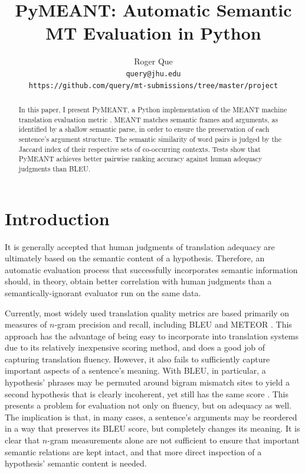 \documentclass[11pt,twocolumn]{article}
\begin{document}
\title{PyMEANT: Automatic Semantic MT Evaluation in Python}
\author{
    Roger Que\\
    {\tt query@jhu.edu}\\
    {\tt https://github.com/query/mt-submissions/tree/master/project}
}
\maketitle


\begin{abstract}
In this paper, I present PyMEANT, a Python implementation of the MEANT
machine translation evaluation metric \cite{Lo:2012}.
MEANT matches semantic frames and arguments, as identified by a shallow
semantic parse, in order to ensure the preservation of each sentence's
argument structure.
The semantic similarity of word pairs is judged by the Jaccard index of
their respective sets of co-occurring contexts.
Tests show that PyMEANT achieves better pairwise ranking accuracy
against human adequacy judgments than BLEU.
\end{abstract}


\section{Introduction}

It is generally accepted that human judgments of translation adequacy
are ultimately based on the semantic content of a hypothesis.
Therefore, an automatic evaluation process that successfully
incorporates semantic information should, in theory, obtain better
correlation with human judgments than a semantically-ignorant evaluator
run on the same data.

Currently, most widely used translation quality metrics are based
primarily on measures of $n$-gram precision and recall, including
BLEU \cite{Papineni:2002} and METEOR \cite{Banerjee:2005}.
This approach has the advantage of being easy to incorporate into
translation systems due to its relatively inexpensive scoring method,
and does a good job of capturing translation fluency.
However, it also fails to sufficiently capture important aspects of a
sentence's meaning.
With BLEU, in particular, a hypothesis' phrases may be permuted around
bigram mismatch sites to yield a second hypothesis that is clearly
incoherent, yet still has the same score \cite{Callison-Burch:2006}.
This presents a problem for evaluation not only on fluency, but on
adequacy as well.
The implication is that, in many cases, a sentence's arguments may be
reordered in a way that preserves its BLEU score, but completely changes
its meaning.
It is clear that $n$-gram measurements alone are not sufficient to
ensure that important semantic relations are kept intact, and that
more direct inspection of a hypothesis' semantic content is needed.
\end{document}
